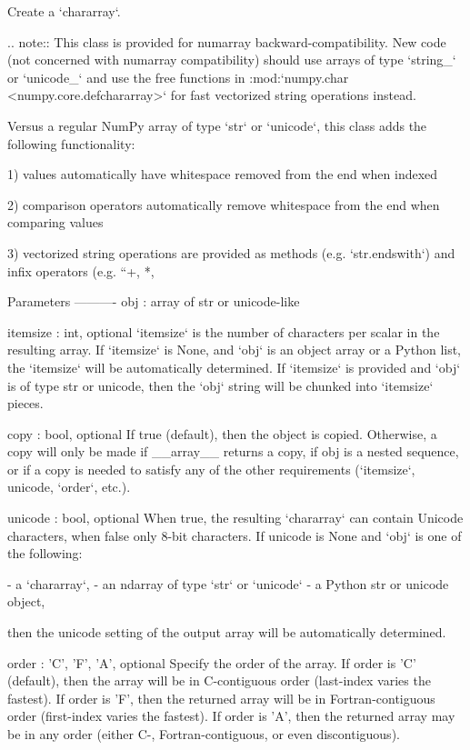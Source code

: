 \begin{DoxyVerb}Create a `chararray`.

.. note::
   This class is provided for numarray backward-compatibility.
   New code (not concerned with numarray compatibility) should use
   arrays of type `string_` or `unicode_` and use the free functions
   in :mod:`numpy.char <numpy.core.defchararray>` for fast
   vectorized string operations instead.

Versus a regular NumPy array of type `str` or `unicode`, this
class adds the following functionality:

  1) values automatically have whitespace removed from the end
     when indexed

  2) comparison operators automatically remove whitespace from the
     end when comparing values

  3) vectorized string operations are provided as methods
     (e.g. `str.endswith`) and infix operators (e.g. ``+, *, %

Parameters
----------
obj : array of str or unicode-like

itemsize : int, optional
    `itemsize` is the number of characters per scalar in the
    resulting array.  If `itemsize` is None, and `obj` is an
    object array or a Python list, the `itemsize` will be
    automatically determined.  If `itemsize` is provided and `obj`
    is of type str or unicode, then the `obj` string will be
    chunked into `itemsize` pieces.

copy : bool, optional
    If true (default), then the object is copied.  Otherwise, a copy
    will only be made if __array__ returns a copy, if obj is a
    nested sequence, or if a copy is needed to satisfy any of the other
    requirements (`itemsize`, unicode, `order`, etc.).

unicode : bool, optional
    When true, the resulting `chararray` can contain Unicode
    characters, when false only 8-bit characters.  If unicode is
    None and `obj` is one of the following:

      - a `chararray`,
      - an ndarray of type `str` or `unicode`
      - a Python str or unicode object,

    then the unicode setting of the output array will be
    automatically determined.

order : {'C', 'F', 'A'}, optional
    Specify the order of the array.  If order is 'C' (default), then the
    array will be in C-contiguous order (last-index varies the
    fastest).  If order is 'F', then the returned array
    will be in Fortran-contiguous order (first-index varies the
    fastest).  If order is 'A', then the returned array may
    be in any order (either C-, Fortran-contiguous, or even
    discontiguous).
\end{DoxyVerb}
 \mbox{\label{namespacenumpy_1_1core_1_1defchararray_a57c79838261fef885ef869fbb5a0330b}} 
